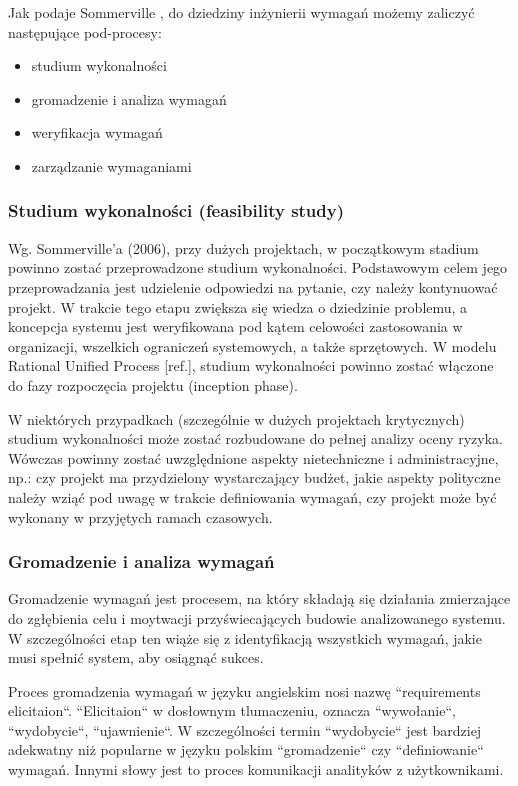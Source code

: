       Jak podaje Sommerville \cite{Somm06}, do dziedziny inżynierii wymagań możemy zaliczyć następujące pod-procesy:

      \begin{itemize} 
          \item studium wykonalności 
          \item gromadzenie i analiza wymagań
          \item weryfikacja wymagań
          \item zarządzanie wymaganiami
      \end{itemize}

      \subsubsection{Studium wykonalności (feasibility study)}

        Wg. Sommerville'a (2006), przy dużych projektach, w początkowym stadium powinno zostać przeprowadzone studium wykonalności. Podstawowym celem jego przeprowadzania jest udzielenie odpowiedzi na pytanie, czy należy kontynuować projekt. W trakcie tego etapu zwiększa się wiedza o dziedzinie problemu, a koncepcja systemu jest weryfikowana pod kątem celowości zastosowania w organizacji, wszelkich ograniczeń systemowych, a także sprzętowych. W modelu Rational Unified Process [ref.], studium wykonalności powinno zostać włączone do fazy rozpoczęcia projektu (inception phase).

        W niektórych przypadkach (szczególnie w dużych projektach krytycznych) studium wykonalności może zostać rozbudowane do pełnej analizy oceny ryzyka. Wówczas powinny zostać uwzględnione aspekty nietechniczne i administracyjne, np.: czy projekt ma przydzielony wystarczający budżet, jakie aspekty polityczne należy wziąć pod uwagę w trakcie definiowania wymagań, czy projekt może być wykonany w przyjętych ramach czasowych.

      \subsubsection{Gromadzenie i analiza wymagań}

        Gromadzenie wymagań jest procesem, na który składają się działania zmierzające do zgłębienia celu i moytwacji przyświecających budowie analizowanego systemu. W szczególności etap ten wiąże się z identyfikacją wszystkich wymagań, jakie musi spełnić system, aby osiągnąć sukces.
        
        Proces gromadzenia wymagań w języku angielskim nosi nazwę ``requirements elicitaion``. ``Elicitaion`` w dosłownym tlumaczeniu, oznacza ``wywołanie``, ``wydobycie``, ``ujawnienie``. W szczególności termin ``wydobycie`` jest bardziej adekwatny niż popularne w języku polskim ``gromadzenie`` czy ``definiowanie`` wymagań. Innymi słowy jest to proces komunikacji analityków z użytkownikami. 

